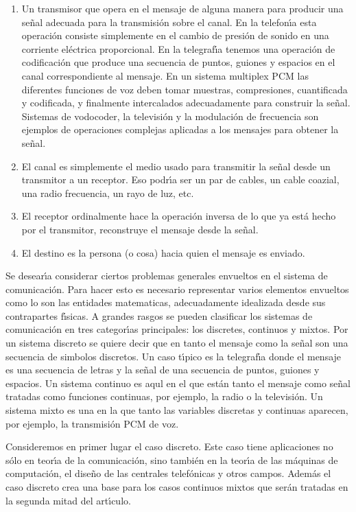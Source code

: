 \begin{enumerate}
\item{Un transmisor que opera en el mensaje de alguna manera para
  producir una se\~{n}al adecuada para la transmisi\'{o}n sobre el
  canal. En la telefon\'{\i}a esta operaci\'{o}n consiste simplemente
  en el cambio de presi\'{o}n de sonido en una corriente el\'{e}ctrica
  proporcional. En la telegraf\'{\i}a tenemos una operaci\'{o}n de
  codificaci\'{o}n que produce una secuencia de puntos, guiones y
  espacios en el canal correspondiente al mensaje. En un sistema
  multiplex PCM las diferentes funciones de voz deben tomar muestras,
  compresiones, cuantificada y codificada, y finalmente intercalados
  adecuadamente para construir la se\~{n}al. Sistemas de vodocoder, la
  televisi\'{o}n y la modulaci\'{o}n de frecuencia son ejemplos de
  operaciones complejas aplicadas a los mensajes para obtener la
  se\~{n}al.}
\item{El canal es simplemente el medio usado para transmitir la
  se\~{n}al desde un transmitor a un receptor. Eso podr\'{\i}a ser un
  par de cables, un cable coazial, una radio frecuencia, un rayo de
  luz, etc.}
\item{El receptor ordinalmente hace la operaci\'{o}n inversa de lo que
  ya est\'{a} hecho por el transmitor, reconstruye el mensaje desde la
  se\~{n}al.}
\item{El destino es la persona (o cosa) hacia quien el mensaje es
  enviado.}
\end{enumerate}

Se desear\'{\i}a considerar ciertos problemas generales envueltos en
el sistema de comunicaci\'{o}n. Para hacer esto es necesario
representar varios elementos envueltos como lo son las entidades
matematicas, adecuadamente idealizada desde sus contrapartes
f\'{\i}sicas. A grandes rasgos se pueden clasificar los sistemas de
comunicaci\'{o}n en tres categor\'{\i}as principales: los discretes,
continuos y mixtos. Por un sistema discreto se quiere decir que en
tanto el mensaje como la se\~{n}al son una secuencia de simbolos
discretos. Un caso t\'{\i}pico es la telegraf\'{\i}a donde el mensaje
es una secuencia de letras y la se\~{n}al de una secuencia de puntos,
guiones y espacios. Un sistema continuo es aqul en el que est\'{a}n
tanto el mensaje como se\~{n}al tratadas como funciones continuas, por
ejemplo, la radio o la televisi\'{o}n. Un sistema mixto es una en la
que tanto las variables discretas y continuas aparecen, por ejemplo,
la transmisi\'{o}n PCM de voz. 

Consideremos en primer lugar el caso discreto. Este caso tiene
aplicaciones no s\'{o}lo en teor\'{\i}a de la comunicaci\'{o}n, sino
tambi\'{e}n en la teor\'{\i}a de las m\'{a}quinas de computaci\'{o}n,
el dise\~{n}o de las centrales telef\'{o}nicas y otros campos.
Adem\'{a}s el caso discreto crea una base para los casos continuos
mixtos que ser\'{a}n tratadas en la segunda mitad del art\'{\i}culo.


